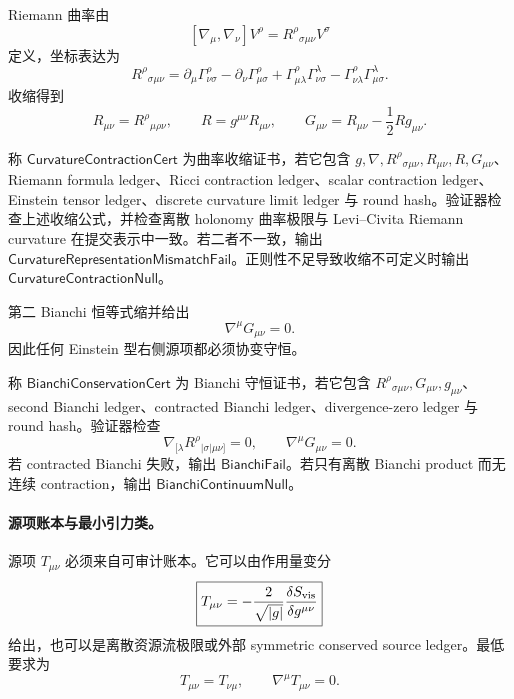Riemann 曲率由
\[
[\nabla_\mu,\nabla_\nu]V^\rho
=
R^\rho{}_{\sigma\mu\nu}V^\sigma
\]
定义，坐标表达为
\[
\boxed{
R^\rho{}_{\sigma\mu\nu}
=
\partial_\mu\Gamma^\rho_{\nu\sigma}
-
\partial_\nu\Gamma^\rho_{\mu\sigma}
+
\Gamma^\rho_{\mu\lambda}\Gamma^\lambda_{\nu\sigma}
-
\Gamma^\rho_{\nu\lambda}\Gamma^\lambda_{\mu\sigma}.
}
\]
收缩得到
\[
R_{\mu\nu}=R^\rho{}_{\mu\rho\nu},
\qquad
R=g^{\mu\nu}R_{\mu\nu},
\qquad
\boxed{
G_{\mu\nu}=R_{\mu\nu}-\frac12Rg_{\mu\nu}.
}
\]

\begin{definition}[曲率收缩证书]\label{def:typed-address-biaxial-completion-curvature-contraction-cert}
称 \(\mathsf{CurvatureContractionCert}\) 为曲率收缩证书，若它包含 \(g,\nabla,R^\rho{}_{\sigma\mu\nu},R_{\mu\nu},R,G_{\mu\nu}\)、Riemann formula ledger、Ricci contraction ledger、scalar contraction ledger、Einstein tensor ledger、discrete curvature limit ledger 与 round hash。验证器检查上述收缩公式，并检查离散 holonomy 曲率极限与 Levi--Civita Riemann curvature 在提交表示中一致。若二者不一致，输出 \(\mathsf{CurvatureRepresentationMismatchFail}\)。正则性不足导致收缩不可定义时输出 \(\mathsf{CurvatureContractionNull}\)。
\end{definition}

第二 Bianchi 恒等式缩并给出
\[
\boxed{
\nabla^\mu G_{\mu\nu}=0.
}
\]
因此任何 Einstein 型右侧源项都必须协变守恒。

\begin{definition}\label{def:typed-address-biaxial-completion-bianchi-conservation-cert}
称 \(\mathsf{BianchiConservationCert}\) 为 Bianchi 守恒证书，若它包含 \(R^\rho{}_{\sigma\mu\nu},G_{\mu\nu},g_{\mu\nu}\)、second Bianchi ledger、contracted Bianchi ledger、divergence-zero ledger 与 round hash。验证器检查
\[
\nabla_{[\lambda}R^\rho{}_{|\sigma|\mu\nu]}=0,
\qquad
\nabla^\mu G_{\mu\nu}=0.
\]
若 contracted Bianchi 失败，输出 \(\mathsf{BianchiFail}\)。若只有离散 Bianchi product 而无连续 contraction，输出 \(\mathsf{BianchiContinuumNull}\)。
\end{definition}

\paragraph{源项账本与最小引力类。}
源项 \(T_{\mu\nu}\) 必须来自可审计账本。它可以由作用量变分
\[
\boxed{
T_{\mu\nu}
=
-\frac{2}{\sqrt{|g|}}
\frac{\delta S_{\rm vis}}{\delta g^{\mu\nu}}
}
\]
给出，也可以是离散资源流极限或外部 symmetric conserved source ledger。最低要求为
\[
T_{\mu\nu}=T_{\nu\mu},
\qquad
\nabla^\mu T_{\mu\nu}=0.
\]

